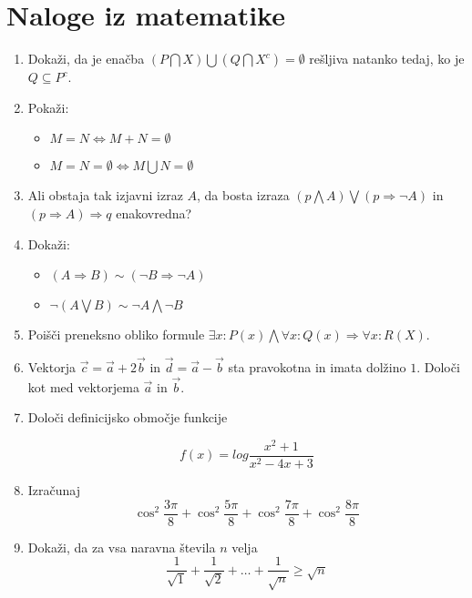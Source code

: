 \documentclass[a4paper,12pt]{article}
\begin{document}
\section{Naloge iz matematike}
\begin{enumerate}
    

\item Dokaži, da je enačba $ ( P \bigcap X ) \bigcup ( Q \bigcap X^c ) =  \emptyset $
rešljiva natanko tedaj, ko je $Q \subseteq P^c $.

\item Pokaži:
\begin{itemize}
    \item $M = N \iff M + N = \emptyset $
    \item $M = N = \emptyset \iff M \bigcup N = \emptyset $
\end{itemize}


\item Ali obstaja tak izjavni izraz $ A $, da bosta izraza
$ (p \bigwedge A ) \bigvee (p \Rightarrow \neg A )  $ in $ (p \Rightarrow A) \Rightarrow q $
enakovredna?

\item Dokaži:
\begin{itemize}
    \item $(A \Rightarrow B) \sim (\neg B \Rightarrow \neg A )  $
    \item $ \neg (A \bigvee B) \sim \neg A \bigwedge \neg B $
\end{itemize}

\item Poišči preneksno obliko formule $ \exists x : P(x) \bigwedge \forall x : Q(x) \Rightarrow \forall x : R(X) $.

\item Vektorja $\vec{c} = \vec{a} + 2\vec{b} $ in $\vec{d} = \vec{a} - \vec{b}$
sta pravokotna in imata dolžino $1$. Določi kot med vektorjema $\vec{a}$ in $\vec{b}$.

\item Določi definicijsko območje funkcije

    \[ f(x) = log \dfrac{x^2 + 1}{x^2 - 4x + 3} \]


\item Izračunaj
\[ \cos^2 \dfrac{3 \pi}{8} + \cos^2\dfrac{5\pi}{8} + \cos^2\dfrac{7\pi}{8} + \cos^2\dfrac{8\pi}{8} \]

\item Dokaži, da za vsa naravna števila $n$ velja
\[ \dfrac{1}{\sqrt{1}} + \dfrac{1}{\sqrt{2}} + \dots + \dfrac{1}{\sqrt{n}} \ge \sqrt{n}    \]


\end{enumerate}
\end{document}
